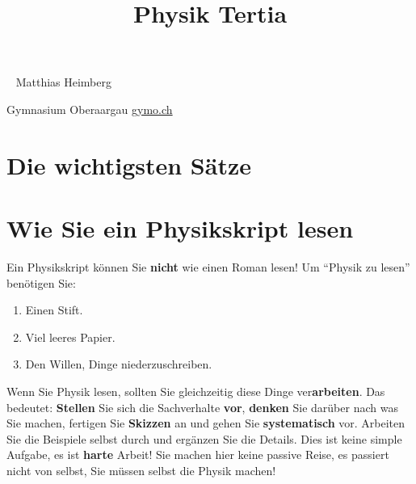 \documentclass[justified,openany,nofonts]{tufte-book}
\title{Physik Tertia}
\begin{document}
\maketitle



\begin{fullwidth}
~\vfill
\thispagestyle{empty}
\setlength{\parindent}{0pt}
\setlength{\parskip}{\baselineskip}
Matthias Heimberg

Gymnasium Oberaargau \url{gymo.ch}



\end{fullwidth}


\tableofcontents





\chapter*{Die wichtigsten Sätze}%



\chapter*{Wie Sie ein Physikskript lesen}

Ein Physikskript können Sie \textbf{nicht} wie einen Roman lesen! Um ``Physik zu lesen'' benötigen Sie:
\begin{enumerate}
\item Einen Stift.
\item Viel leeres Papier.
\item Den Willen, Dinge niederzuschreiben.
\end{enumerate}
Wenn Sie Physik lesen, sollten Sie gleichzeitig diese Dinge ver\textbf{arbeiten}. Das bedeutet: \textbf{Stellen} Sie sich die Sachverhalte \textbf{vor}, \textbf{denken} Sie darüber nach was Sie machen, fertigen Sie \textbf{Skizzen} an und gehen Sie \textbf{systematisch} vor. Arbeiten Sie die Beispiele selbst durch und ergänzen Sie die Details. Dies ist keine simple Aufgabe, es ist \textbf{harte} Arbeit! Sie machen hier keine passive Reise, es passiert nicht von selbst, Sie müssen selbst die Physik machen! 



\setcounter{chapter}{-1}
\end{document}
